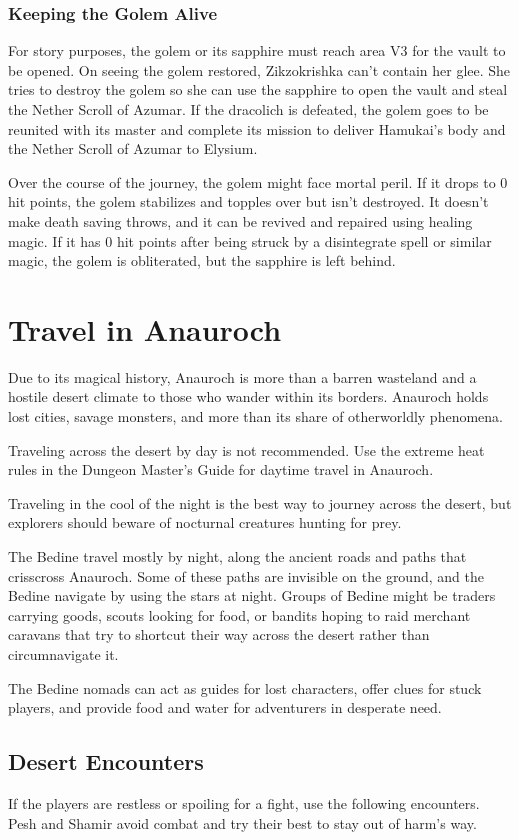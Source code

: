 \documentclass[10pt,a4paper,twoside,bg=print,twocolumn,openany,nodeprecatedcode]{dndbook}
\begin{document}
\subsubsection{Keeping the Golem Alive}
For story purposes, the golem or its sapphire must reach area V3 for the vault to be opened. On seeing the golem restored, Zikzokrishka can't contain her glee. She tries to destroy the golem so she can use the sapphire to open the vault and steal the Nether Scroll of Azumar. If the dracolich is defeated, the golem goes to be reunited with its master and complete its mission to deliver Hamukai's body and the Nether Scroll of Azumar to Elysium.

Over the course of the journey, the golem might face mortal peril. If it drops to 0 hit points, the golem stabilizes and topples over but isn't destroyed. It doesn't make death saving throws, and it can be revived and repaired using healing magic. If it has 0 hit points after being struck by a disintegrate spell or similar magic, the golem is obliterated, but the sapphire is left behind.

\section{Travel in Anauroch}
Due to its magical history, Anauroch is more than a barren wasteland and a hostile desert climate to those who wander within its borders. Anauroch holds lost cities, savage monsters, and more than its share of otherworldly phenomena.

Traveling across the desert by day is not recommended. Use the extreme heat rules in the Dungeon Master's Guide for daytime travel in Anauroch.

Traveling in the cool of the night is the best way to journey across the desert, but explorers should beware of nocturnal creatures hunting for prey.

The Bedine travel mostly by night, along the ancient roads and paths that crisscross Anauroch. Some of these paths are invisible on the ground, and the Bedine navigate by using the stars at night. Groups of Bedine might be traders carrying goods, scouts looking for food, or bandits hoping to raid merchant caravans that try to shortcut their way across the desert rather than circumnavigate it.

The Bedine nomads can act as guides for lost characters, offer clues for stuck players, and provide food and water for adventurers in desperate need.

\subsection{Desert Encounters}
If the players are restless or spoiling for a fight, use the following encounters. Pesh and Shamir avoid combat and try their best to stay out of harm's way.
\end{document}
